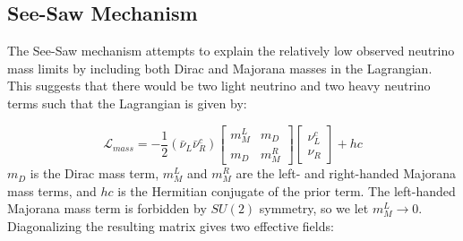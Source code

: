 \subsection{See-Saw Mechanism}
The See-Saw mechanism attempts to explain the relatively low observed neutrino mass limits by including both Dirac and Majorana masses in the Lagrangian. This suggests that there would be two light neutrino and two heavy neutrino terms such that the Lagrangian is given by:



\begin{equation}\label{mass_lagrangian}
\mathcal{L}_{mass} = -\frac{1}{2}(\bar{\nu}_L\bar{\nu}_R^c) \begin{bmatrix} m_M^L & m_D \\ m_D & m_M^R \end{bmatrix} \begin{bmatrix} \nu_L^c \\ \nu_R \end{bmatrix} + hc
\end{equation}
\noindent
$m_D$ is the Dirac mass term, $m_M^L$ and $m_M^R$ are the left- and right-handed Majorana mass terms, and $hc$ is the Hermitian conjugate of the prior term. The left-handed Majorana mass term is forbidden by $SU (2)$ symmetry, so we let $m_M^L \rightarrow 0$. Diagonalizing the resulting matrix gives two effective fields: 

